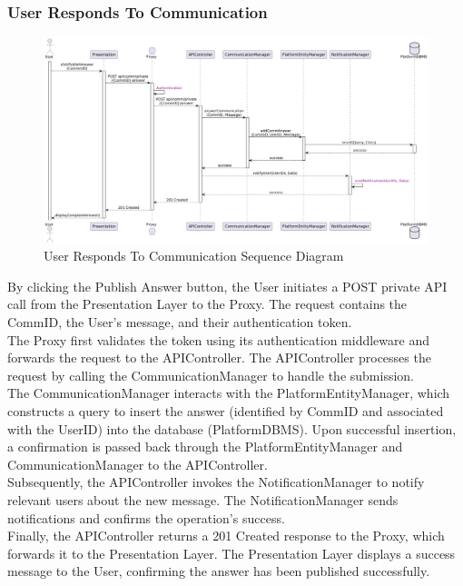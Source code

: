 \subsubsection*{User Responds To Communication}
\begin{figure}[H]
    \centering
    \includegraphics[width=\linewidth]{Latex/Images/DD/SequenceDiagrams/15UserRespondsToComm.png}
    \caption{User Responds To Communication Sequence Diagram}
    \label{fig: usrespondcomm}
\end{figure}
By clicking the Publish Answer button, the User initiates a POST private API call from the Presentation Layer to the Proxy. The request contains the CommID, the User's message, and their authentication token.\\
The Proxy first validates the token using its authentication middleware and forwards the request to the APIController. The APIController processes the request by calling the CommunicationManager to handle the submission.\\
The CommunicationManager interacts with the PlatformEntityManager, which constructs a query to insert the answer (identified by CommID and associated with the UserID) into the database (PlatformDBMS). Upon successful insertion, a confirmation is passed back through the PlatformEntityManager and CommunicationManager to the APIController.\\
Subsequently, the APIController invokes the NotificationManager to notify relevant users about the new message. The NotificationManager sends notifications and confirms the operation's success.\\
Finally, the APIController returns a 201 Created response to the Proxy, which forwards it to the Presentation Layer. The Presentation Layer displays a success message to the User, confirming the answer has been published successfully.


